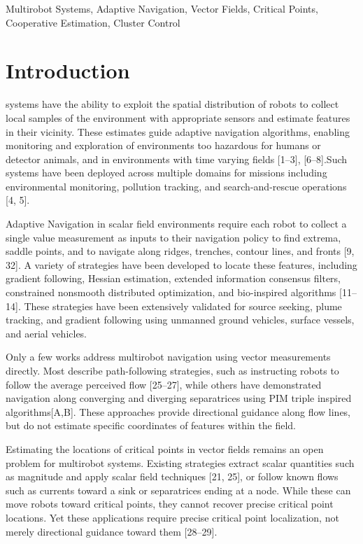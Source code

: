 \documentclass[lettersize,journal]{IEEEtran}
\begin{document}
\begin{IEEEkeywords}
Multirobot Systems, Adaptive Navigation, Vector Fields, Critical Points, Cooperative Estimation, Cluster Control
\end{IEEEkeywords}



\section{Introduction}

 systems have the ability to exploit the spatial distribution of robots to collect local samples of the environment with appropriate sensors and estimate features in their vicinity. These estimates guide adaptive navigation algorithms, enabling monitoring and exploration of environments too hazardous for humans or detector animals, and in environments with time varying fields [1--3], [6--8].Such systems have been deployed across multiple domains for missions including environmental monitoring, pollution tracking, and search-and-rescue operations [4, 5].

Adaptive Navigation in scalar field environments require each robot to collect a single value measurement as inputs to their navigation policy to find extrema, saddle points, and to navigate along ridges, trenches, contour lines, and fronts [9, 32]. A variety of strategies have been developed to locate these features, including gradient following, Hessian estimation, extended information consensus filters, constrained nonsmooth distributed optimization, and bio-inspired algorithms [11--14]. These strategies have been extensively validated for source seeking, plume tracking, and gradient following using unmanned ground vehicles, surface vessels, and aerial vehicles.


Only a few works address multirobot navigation using vector measurements directly. Most describe path-following strategies, such as instructing robots to follow the average perceived flow [25--27], while others have demonstrated navigation along converging and diverging separatrices using PIM triple inspired algorithms[A,B]. These approaches provide directional guidance along flow lines, but do not estimate specific coordinates of features within the field.

Estimating the locations of critical points in vector fields remains an open problem for multirobot systems. Existing strategies extract scalar quantities such as magnitude and apply scalar field techniques [21, 25], or follow known flows such as currents toward a sink or separatrices ending at a node. While these can move robots toward critical points, they cannot recover precise critical point locations. Yet these applications require precise critical point localization, not merely directional guidance toward them [28--29].
\end{document}
